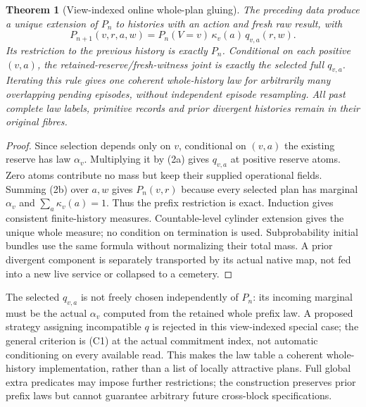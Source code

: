 \documentclass{article}
\newtheorem{theorem}{Theorem}\newtheorem{proposition}{Proposition}
\begin{document}
\begin{theorem}[View-indexed online whole-plan gluing]
The preceding data produce a unique extension of $P_n$ to histories with an action and fresh raw result, with
\[
 P_{n+1}(v,r,a,w)=P_n(V=v)\,\kappa_v(a)\,q_{v,a}(r,w).\tag{2b}
\]
Its restriction to the previous history is exactly $P_n$. Conditional on each positive $(v,a)$, the retained-reserve/fresh-witness joint is exactly the selected full $q_{v,a}$. Iterating this rule gives one coherent whole-history law for arbitrarily many overlapping pending episodes, without independent episode resampling. All past complete law labels, primitive records and prior divergent histories remain in their original fibres.
\end{theorem}
\begin{proof}
Since selection depends only on $v$, conditional on $(v,a)$ the existing reserve has law $\alpha_v$. Multiplying it by (2a) gives $q_{v,a}$ at positive reserve atoms. Zero atoms contribute no mass but keep their supplied operational fields. Summing (2b) over $a,w$ gives $P_n(v,r)$ because every selected plan has marginal $\alpha_v$ and $\sum_a\kappa_v(a)=1$. Thus the prefix restriction is exact. Induction gives consistent finite-history measures. Countable-level cylinder extension gives the unique whole measure; no condition on termination is used. Subprobability initial bundles use the same formula without normalizing their total mass. A prior divergent component is separately transported by its actual native map, not fed into a new live service or collapsed to a cemetery.
\end{proof}

The selected $q_{v,a}$ is not freely chosen independently of $P_n$: its incoming marginal must be the actual $\alpha_v$ computed from the retained whole prefix law. A proposed strategy assigning incompatible $q$ is rejected in this view-indexed special case; the general criterion is (C1) at the actual commitment index, not automatic conditioning on every available read. This makes the law table a coherent whole-history implementation, rather than a list of locally attractive plans. Full global extra predicates may impose further restrictions; the construction preserves prior prefix laws but cannot guarantee arbitrary future cross-block specifications.
\end{document}
